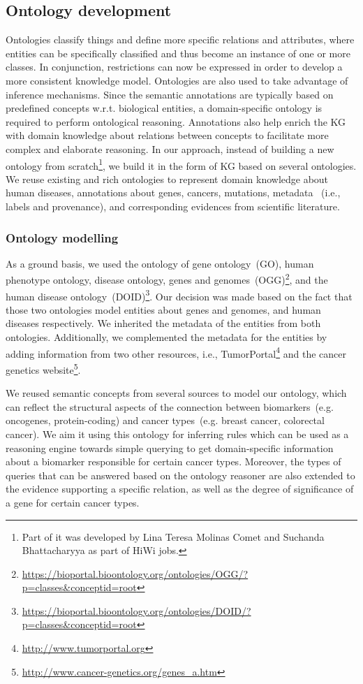 \subsection{Ontology development}
Ontologies classify things and define more specific relations and attributes, where entities can be specifically classified and thus become an
instance of one or more classes. In conjunction, restrictions can now be expressed in order to develop a more consistent knowledge model. Ontologies are also used to take advantage of inference mechanisms. Since the semantic annotations are typically based on predefined concepts w.r.t. biological entities, a domain-specific ontology is required to perform ontological reasoning. Annotations also help enrich the KG with domain knowledge about relations between concepts to facilitate more complex and elaborate reasoning. In our approach, instead of building a new ontology from scratch\footnote{Part of it was developed by Lina Teresa Molinas Comet and Suchanda Bhattacharyya as part of HiWi jobs.}, we build it in the form of KG based on several ontologies. We reuse existing and rich ontologies to represent domain knowledge about human diseases, annotations about genes, cancers, mutations, metadata ~(i.e., labels and provenance), and corresponding evidences from scientific literature. 

\subsubsection{Ontology modelling}
As a ground basis, we used the ontology of gene ontology~(GO), human phenotype ontology, disease ontology, genes and genomes~(OGG)\footnote{\url{https://bioportal.bioontology.org/ontologies/OGG/?p=classes&conceptid=root}}, and the human disease ontology~(DOID)\footnote{\url{https://bioportal.bioontology.org/ontologies/DOID/?p=classes&conceptid=root}}. Our decision was made based on the fact that those two ontologies model entities about genes and genomes, and human diseases respectively. We inherited the metadata of the entities from both ontologies. Additionally, we complemented the metadata for the entities by adding information from two other resources, i.e., TumorPortal\footnote{\url{http://www.tumorportal.org}} and the cancer genetics website\footnote{\url{http://www.cancer-genetics.org/genes_a.htm}}. 

\hspace*{3.5mm} We reused semantic concepts from several sources to model our ontology, which can reflect the structural aspects of the connection between biomarkers~(e.g. oncogenes, protein-coding) and cancer types~(e.g. breast cancer, colorectal cancer). We aim it using this ontology for inferring rules which can be used as a reasoning engine towards simple querying to get domain-specific information about a biomarker responsible for certain cancer types. Moreover, the types of queries that can be answered based on the ontology reasoner are also extended to the evidence supporting a specific relation, as well as the degree of significance of a gene for certain cancer types. 

